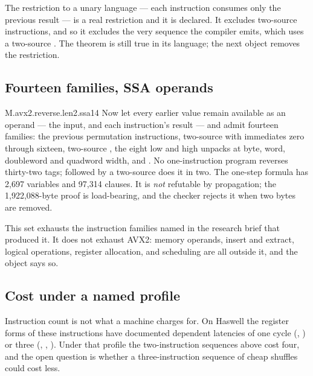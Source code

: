 The restriction to a unary language --- each instruction consumes only the previous result --- is a real restriction and it is declared. It excludes two-source instructions, and so it excludes the very sequence the compiler emits, which uses a two-source . The theorem is still true in its language; the next object removes the restriction.

\subsection{Fourteen families, SSA operands}

\begin{artifact}{M.avx2.reverse.len2.ssa14}
Now let every earlier value remain available as an operand --- the input, and each instruction's result --- and admit fourteen families: the previous permutation instructions, two-source  with immediates zero through sixteen, two-source , the eight low and high unpacks at byte, word, doubleword and quadword width, and . No one-instruction program reverses thirty-two tags;  followed by a two-source  does it in two. The one-step formula has 2,697 variables and 97,314 clauses. It is \emph{not} refutable by propagation; the 1,922,088-byte proof is load-bearing, and the checker rejects it when two bytes are removed.

This set exhausts the instruction families named in the research brief that produced it. It does not exhaust AVX2: memory operands, insert and extract, logical operations, register allocation, and scheduling are all outside it, and the object says so.
\end{artifact}

\subsection{Cost under a named profile}

Instruction count is not what a machine charges for. On Haswell the register forms of these instructions have documented dependent latencies of one cycle (, ) or three (, , ). Under that profile the two-instruction sequences above cost four, and the open question is whether a three-instruction sequence of cheap shuffles could cost less.

